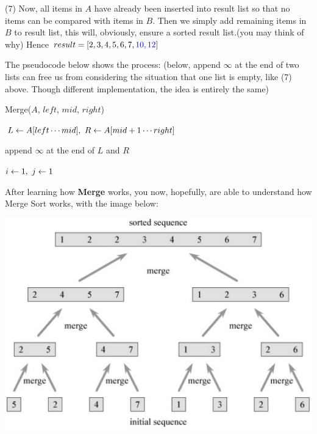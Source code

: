 \documentclass[11pt, a4paper]{COMP3711}
\begin{document}
\begin{spacing}{1.5}
    (7) Now, all items in $A$ have already been inserted into result 
    list so that no items can be compared with items in $B$.
    Then we simply add remaining items in $B$ to result list,
    this will, obviously, ensure a sorted result list.(you may think of why)
    Hence $result=[2,3,4,5,6,7,{\color{blue} 10,12}]$

    The pseudocode below shows the process:
    (below, append $\infty$ at the end of two lists can 
    free us from considering the situation that one list is 
    empty, like (7) above. Though different implementation, 
    the idea is entirely the same)
    
    \begin{algorithm}
        \caption{Merge($A$, $left$, $mid$, $right$)}
        $L\leftarrow A[left\cdots mid],\ R\leftarrow A[mid+1\cdots right]$

        append $\infty$ at the end of $L$ and $R$ \qquad {}

        $i\leftarrow 1,\ j\leftarrow 1$\qquad  {}

         {
        }
    \end{algorithm}

    After learning how {\bf Merge} works, you now, hopefully,
    are able to understand how Merge Sort works, with the image below:

    \begin{center}
        \includegraphics[scale=0.2]{images/02-mergeSort.jpeg}
    \end{center}
    

\end{spacing}
\end{document}
